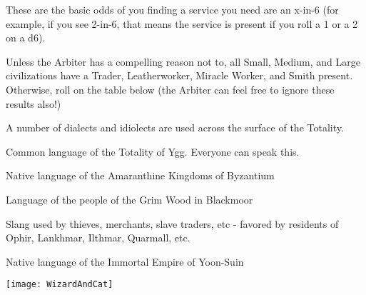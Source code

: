 {  These are the basic odds of you finding a service you need are an x-in-6 (for example, if you see 2-in-6, that means the service is present if you  roll a 1 or a 2 on a d6).

  Unless the Arbiter has a compelling reason not to, all Small, Medium, and Large civilizations have a Trader, Leatherworker, Miracle Worker, and Smith present.  Otherwise, roll on the table below (the Arbiter can feel free to ignore these results also!)



  \newpage



  A number of dialects and idiolects are used across the surface of the Totality.
  


  Common language of the Totality of Ygg.  Everyone can speak this.


  Native language of the Amaranthine Kingdoms of Byzantium


  Language of the people of the Grim Wood in Blackmoor



  Slang used by thieves, merchants, slave traders, etc - favored by residents of Ophir, Lankhmar, Ilthmar, Quarmall, etc.


  Native language of the Immortal Empire of Yoon-Suin

  \begin{center}
  \texttt{[image: WizardAndCat]}
  \end{center}

}
